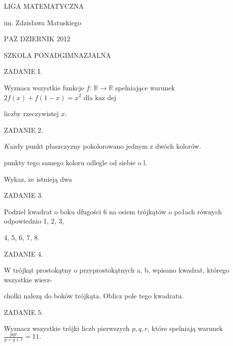 \documentclass[a4paper,12pt]{article}
\begin{document}
LIGA MATEMATYCZNA

im. Zdzisława Matuskiego

$\mathrm{P}\mathrm{A}\acute{\mathrm{Z}}$ DZIERNIK 2012

SZKOLA PONADGIMNAZJALNA

ZADANIE I.

Wyznacz wszystkie funkcje $f$: $\mathbb{R}\rightarrow \mathbb{R}$ spelniające warunek $2f(x)+f(1-x) =x^{2}$ dla $\mathrm{k}\mathrm{a}\dot{\mathrm{z}}$ dej

liczby rzeczywistej $x.$

ZADANIE 2.

$K\mathrm{a}\dot{\mathrm{z}}\mathrm{d}\mathrm{y}$ punkt płaszczyzny pokolorowano jednym z dwóch kolorów.

punkty tego samego koloru odlegle od siebie o l.

Wykaz, $\dot{\mathrm{z}}\mathrm{e}$ istnieją dwa

ZADANIE 3.

Podziel kwadrat o boku dfugości 6 na osiem trójkątów o po1ach równych odpowiednio 1, 2, 3,

4, 5, 6, 7, 8.

ZADANIE 4.

W trójkąt prostokątny o przyprostokątnych a, b, wpisano kwadrat, którego wszystkie wierz-

cholki nalezą do boków trójkąta. Oblicz pole tego kwadratu.

ZADANIE 5.

Wyznacz wszystkie trójki liczb pierwszych $p, q, r$, które spelniają warunek $\displaystyle \frac{pqr}{p+q+r}=11.$
\end{document}
